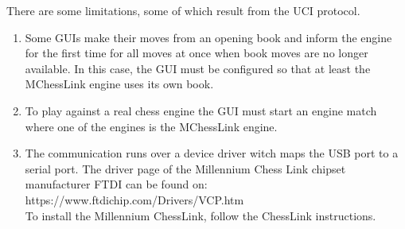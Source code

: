 \documentclass[11pt,a4paper]{article}
\begin{document}
There are some limitations, some of which result from the UCI protocol.
\begin{enumerate}
	\item Some GUIs make their moves from an opening book and inform the engine for the first time for all moves at once when book moves are no longer available. In this case, the GUI must be configured so that at least the MChessLink engine uses its own book.
	\item To play against a real chess engine the GUI must start an engine match where one of the engines is the MChessLink engine.
	\item The communication runs over a device driver witch maps the USB port to a serial port. The driver page of the Millennium Chess Link chipset manufacturer FTDI can be found on: \\ https://www.ftdichip.com/Drivers/VCP.htm
	\\To install the Millennium ChessLink, follow the ChessLink instructions.
\end{enumerate}
\pagebreak
\end{document}
